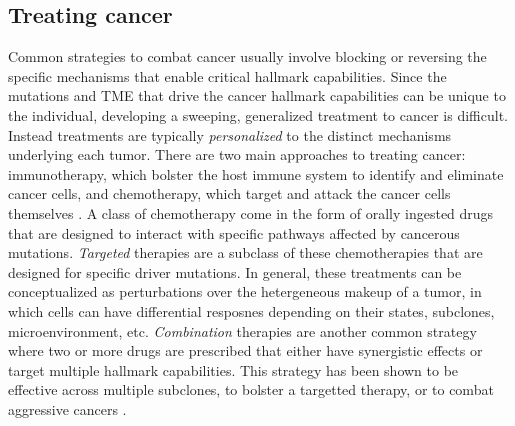 
\subsection{Treating cancer}
Common strategies to combat cancer usually involve blocking or reversing the specific mechanisms that enable critical hallmark capabilities.
Since the mutations and TME that drive the cancer hallmark capabilities can be unique to the individual,
developing a sweeping, generalized treatment to cancer is difficult.
Instead treatments are typically \emph{personalized} to the distinct mechanisms underlying each tumor.
There are two main approaches to treating cancer:
immunotherapy, which bolster the host immune system to identify and eliminate cancer cells,
and chemotherapy, which target and attack the cancer cells themselves \cite{need}.
A class of chemotherapy come in the form of orally ingested drugs that are designed to interact with specific pathways affected by cancerous mutations.
\emph{Targeted} therapies are a subclass of these chemotherapies that are designed for specific driver mutations.
In general, these treatments can be conceptualized as perturbations over the hetergeneous makeup of a tumor, in which cells can have differential resposnes depending on their states, subclones, microenvironment, etc.
\emph{Combination} therapies are another common strategy where two or more drugs are prescribed that either have synergistic effects or target multiple hallmark capabilities.
This strategy has been shown to be effective across multiple subclones, to bolster a targetted therapy, or to combat aggressive cancers \cite{need}.

